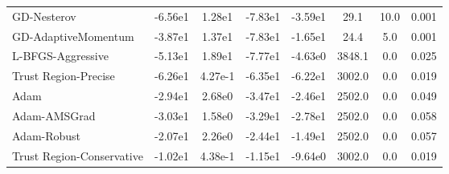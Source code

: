 \documentclass{article}
\begin{document}
\begin{table}[htbp]
{\begin{tabular}{p{2.5cm}*{7}{c}}
GD-Nesterov & -6.56e1 & 1.28e1 & -7.83e1 & -3.59e1 & 29.1 & 10.0 & 0.001 \\
GD-AdaptiveMomentum & -3.87e1 & 1.37e1 & -7.83e1 & -1.65e1 & 24.4 & 5.0 & 0.001 \\
L-BFGS-Aggressive & -5.13e1 & 1.89e1 & -7.77e1 & -4.63e0 & 3848.1 & 0.0 & 0.025 \\
Trust Region-Precise & -6.26e1 & 4.27e-1 & -6.35e1 & -6.22e1 & 3002.0 & 0.0 & 0.019 \\
Adam & -2.94e1 & 2.68e0 & -3.47e1 & -2.46e1 & 2502.0 & 0.0 & 0.049 \\
Adam-AMSGrad & -3.03e1 & 1.58e0 & -3.29e1 & -2.78e1 & 2502.0 & 0.0 & 0.058 \\
Adam-Robust & -2.07e1 & 2.26e0 & -2.44e1 & -1.49e1 & 2502.0 & 0.0 & 0.057 \\
Trust Region-Conservative & -1.02e1 & 4.38e-1 & -1.15e1 & -9.64e0 & 3002.0 & 0.0 & 0.019 \\
\bottomrule
\end{tabular}
}
\end{table}
\end{document}
